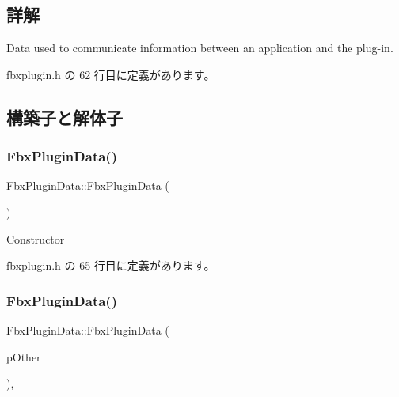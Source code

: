 \subsection{詳解}
Data used to communicate information between an application and the plug-\/in. 

 fbxplugin.\+h の 62 行目に定義があります。



\subsection{構築子と解体子}
\mbox{\label{struct_fbx_plugin_data_a4fb32fb98910a0e08a042710f62cd9bd}} 
\subsubsection{\texorpdfstring{Fbx\+Plugin\+Data()}{FbxPluginData()}\hspace{0.1cm}{\footnotesize\ttfamily [1/2]}}
{\footnotesize\ttfamily Fbx\+Plugin\+Data\+::\+Fbx\+Plugin\+Data (\begin{DoxyParamCaption}{ }\end{DoxyParamCaption})\hspace{0.3cm}{\ttfamily [inline]}}



Constructor 



 fbxplugin.\+h の 65 行目に定義があります。

\mbox{\label{struct_fbx_plugin_data_a917084f1dce5a4d57fd77aeec548bead}} 
\subsubsection{\texorpdfstring{Fbx\+Plugin\+Data()}{FbxPluginData()}\hspace{0.1cm}{\footnotesize\ttfamily [2/2]}}
{\footnotesize\ttfamily Fbx\+Plugin\+Data\+::\+Fbx\+Plugin\+Data (\begin{DoxyParamCaption}\item[{const \hyperlink{struct_fbx_plugin_data}{Fbx\+Plugin\+Data} \&}]{p\+Other }\end{DoxyParamCaption})\hspace{0.3cm}{\ttfamily [inline]}, {\ttfamily [explicit]}}



